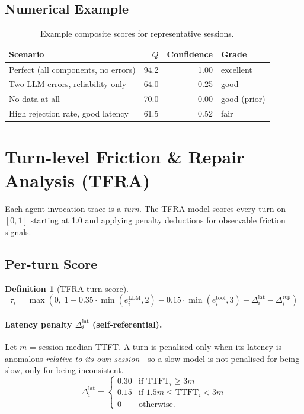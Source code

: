 \documentclass[11pt,a4paper]{article}
\newtheorem{definition}{Definition}
\begin{document}
\subsection{Numerical Example}

\begin{table}[h!]
\centering
\caption{Example composite scores for representative sessions.}
\label{tab:quality-examples}
\begin{tabular}{@{}lrrl@{}}
\toprule
Scenario & $Q$ & Confidence & Grade \\
\midrule
Perfect (all components, no errors) & 94.2 & 1.00 & excellent \\
Two LLM errors, reliability only    & 64.0 & 0.25 & good \\
No data at all                      & 70.0 & 0.00 & good (prior) \\
High rejection rate, good latency   & 61.5 & 0.52 & fair \\
\bottomrule
\end{tabular}
\end{table}

\section{Turn-level Friction \& Repair Analysis (TFRA)}
\label{sec:tfra}

Each agent-invocation trace is a \emph{turn}.  The TFRA model scores every
turn on $[0,1]$ starting at 1.0 and applying penalty deductions for
observable friction signals.

\subsection{Per-turn Score}

\begin{definition}[TFRA turn score]
\[
  \tau_i = \max\!\left(0,\;
    1
    - 0.35 \cdot \min(e^{\text{LLM}}_i, 2)
    - 0.15 \cdot \min(e^{\text{tool}}_i, 3)
    - \Delta^{\text{lat}}_i
    - \Delta^{\text{rep}}_i
  \right)
\]
\end{definition}

\paragraph{Latency penalty $\Delta^{\text{lat}}_i$ (self-referential).}
Let $m$ = session median TTFT.  A turn is penalised only when its
latency is anomalous \emph{relative to its own session}---so a
slow model is not penalised for being slow, only for being inconsistent.
\[
  \Delta^{\text{lat}}_i =
  \begin{cases}
    0.30 & \text{if } \text{TTFT}_i \geq 3m \\
    0.15 & \text{if } 1.5m \leq \text{TTFT}_i < 3m \\
    0    & \text{otherwise.}
  \end{cases}
\]
\end{document}
